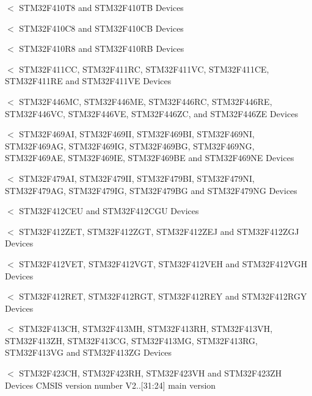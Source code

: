 $<$ S\+T\+M32\+F410\+T8 and S\+T\+M32\+F410\+TB Devices

$<$ S\+T\+M32\+F410\+C8 and S\+T\+M32\+F410\+CB Devices

$<$ S\+T\+M32\+F410\+R8 and S\+T\+M32\+F410\+RB Devices

$<$ S\+T\+M32\+F411\+CC, S\+T\+M32\+F411\+RC, S\+T\+M32\+F411\+VC, S\+T\+M32\+F411\+CE, S\+T\+M32\+F411\+RE and S\+T\+M32\+F411\+VE Devices

$<$ S\+T\+M32\+F446\+MC, S\+T\+M32\+F446\+ME, S\+T\+M32\+F446\+RC, S\+T\+M32\+F446\+RE, S\+T\+M32\+F446\+VC, S\+T\+M32\+F446\+VE, S\+T\+M32\+F446\+ZC, and S\+T\+M32\+F446\+ZE Devices

$<$ S\+T\+M32\+F469\+AI, S\+T\+M32\+F469\+II, S\+T\+M32\+F469\+BI, S\+T\+M32\+F469\+NI, S\+T\+M32\+F469\+AG, S\+T\+M32\+F469\+IG, S\+T\+M32\+F469\+BG, S\+T\+M32\+F469\+NG, S\+T\+M32\+F469\+AE, S\+T\+M32\+F469\+IE, S\+T\+M32\+F469\+BE and S\+T\+M32\+F469\+NE Devices

$<$ S\+T\+M32\+F479\+AI, S\+T\+M32\+F479\+II, S\+T\+M32\+F479\+BI, S\+T\+M32\+F479\+NI, S\+T\+M32\+F479\+AG, S\+T\+M32\+F479\+IG, S\+T\+M32\+F479\+BG and S\+T\+M32\+F479\+NG Devices

$<$ S\+T\+M32\+F412\+C\+EU and S\+T\+M32\+F412\+C\+GU Devices

$<$ S\+T\+M32\+F412\+Z\+ET, S\+T\+M32\+F412\+Z\+GT, S\+T\+M32\+F412\+Z\+EJ and S\+T\+M32\+F412\+Z\+GJ Devices

$<$ S\+T\+M32\+F412\+V\+ET, S\+T\+M32\+F412\+V\+GT, S\+T\+M32\+F412\+V\+EH and S\+T\+M32\+F412\+V\+GH Devices

$<$ S\+T\+M32\+F412\+R\+ET, S\+T\+M32\+F412\+R\+GT, S\+T\+M32\+F412\+R\+EY and S\+T\+M32\+F412\+R\+GY Devices

$<$ S\+T\+M32\+F413\+CH, S\+T\+M32\+F413\+MH, S\+T\+M32\+F413\+RH, S\+T\+M32\+F413\+VH, S\+T\+M32\+F413\+ZH, S\+T\+M32\+F413\+CG, S\+T\+M32\+F413\+MG, S\+T\+M32\+F413\+RG, S\+T\+M32\+F413\+VG and S\+T\+M32\+F413\+ZG Devices

$<$ S\+T\+M32\+F423\+CH, S\+T\+M32\+F423\+RH, S\+T\+M32\+F423\+VH and S\+T\+M32\+F423\+ZH Devices C\+M\+S\+IS version number V2..\mbox{[}31\+:24\mbox{]} main version \mbox{\label{group___library__configuration__section_gafbd304f122892833ce0d4daa3dc4ff13}} 
